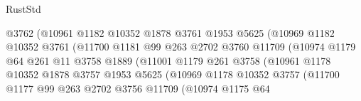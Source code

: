 \begin{lexlean}{RustStd}
\begin{coremodule}
                                    @3762
                                    (@10961
                                      @1182
                                      @10352
                                      @1878
                                      @3761
                                      @1953
                                      @5625
                                      (@10969
                                        @1182
                                        @10352
                                        @3761
                                        (@11700
                                          @1181
                                          @99
                                          @263
                                          @2702
                                          @3760
                                          @11709
                                          (@10974
                                            @1179
                                            @64
                                            @261
                                            @11
                                            @3758
                                            @1889
                                            (@11001
                                              @1179
                                              @261
                                              @3758
                                              (@10961
                                                @1178
                                                @10352
                                                @1878
                                                @3757
                                                @1953
                                                @5625
                                                (@10969
                                                  @1178
                                                  @10352
                                                  @3757
                                                  (@11700
                                                    @1177
                                                    @99
                                                    @263
                                                    @2702
                                                    @3756
                                                    @11709
                                                    (@10974
                                                      @1175
                                                      @64

\end{coremodule}
\end{lexlean}
